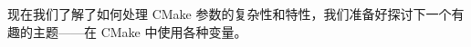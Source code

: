 现在我们了解了如何处理 CMake 参数的复杂性和特性，我们准备好探讨下一个有趣的主题——在 CMake 中使用各种变量。

















































































